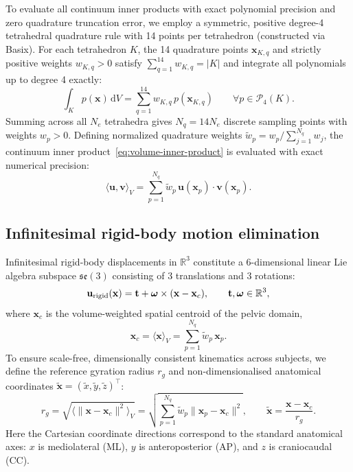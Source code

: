 \documentclass[11pt]{article}
\begin{document}
To evaluate all continuum inner products with exact polynomial precision and zero quadrature truncation error, we employ a symmetric, positive degree-4 tetrahedral quadrature rule with 14 points per tetrahedron (constructed via Basix).
For each tetrahedron $K$, the 14 quadrature points $\mathbf x_{K,q}$ and strictly positive weights $w_{K,q} > 0$ satisfy $\sum_{q=1}^{14} w_{K,q} = |K|$ and integrate all polynomials up to degree 4 exactly:
\begin{equation}
\int_K p(\mathbf x) \, \mathrm{d}V = \sum_{q=1}^{14} w_{K,q} \, p(\mathbf x_{K,q}) \qquad \forall p \in \mathcal{P}_4(K).
\end{equation}
Summing across all $N_e$ tetrahedra gives $N_q = 14 N_e$ discrete sampling points with weights $w_p > 0$.
Defining normalized quadrature weights $\tilde w_p = w_p / \sum_{j=1}^{N_q} w_j$, the continuum inner product~\eqref{eq:volume-inner-product} is evaluated with exact numerical precision:
\begin{equation}
\langle \mathbf u, \mathbf v \rangle_V = \sum_{p=1}^{N_q} \tilde w_p \, \mathbf u(\mathbf x_p) \cdot \mathbf v(\mathbf x_p).
\label{eq:quadrature-sum}
\end{equation}

\subsection{Infinitesimal rigid-body motion elimination}
Infinitesimal rigid-body displacements in $\mathbb{R}^3$ constitute a 6-dimensional linear Lie algebra subspace $\mathfrak{se}(3)$ consisting of 3 translations and 3 rotations:
\begin{equation}
\mathbf u_{\rm rigid}(\mathbf x) = \mathbf t + \boldsymbol\omega \times (\mathbf x - \mathbf x_c), \qquad \mathbf t, \boldsymbol\omega \in \mathbb{R}^3,
\label{eq:rigid-field}
\end{equation}
where $\mathbf x_c$ is the volume-weighted spatial centroid of the pelvic domain,
\begin{equation}
\mathbf x_c = \langle \mathbf x \rangle_V = \sum_{p=1}^{N_q} \tilde w_p \, \mathbf x_p.
\end{equation}
To ensure scale-free, dimensionally consistent kinematics across subjects, we define the reference gyration radius $r_g$ and non-dimensionalised anatomical coordinates $\tilde{\mathbf x} = (\tilde x, \tilde y, \tilde z)^\top$:
\begin{equation}
r_g = \sqrt{\langle \|\mathbf x - \mathbf x_c\|^2 \rangle_V} = \sqrt{\sum_{p=1}^{N_q} \tilde w_p \|\mathbf x_p - \mathbf x_c\|^2}, \qquad
\tilde{\mathbf x} = \frac{\mathbf x - \mathbf x_c}{r_g}.
\label{eq:dimless-coords}
\end{equation}
Here the Cartesian coordinate directions correspond to the standard anatomical axes: $x$ is mediolateral (ML), $y$ is anteroposterior (AP), and $z$ is craniocaudal (CC).
\end{document}
